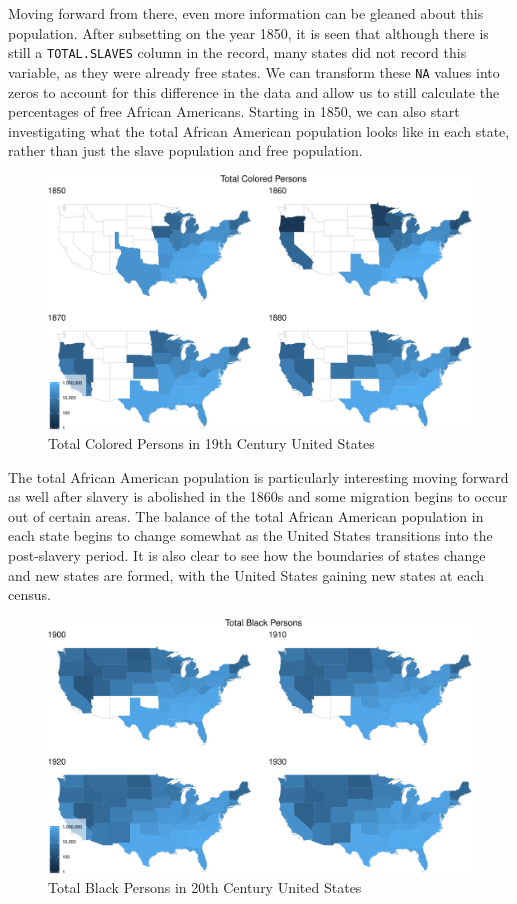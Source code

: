 \documentclass[11pt,]{article}
\begin{document}
Moving forward from there, even more information can be gleaned about
this population. After subsetting on the year 1850, it is seen that
although there is still a \texttt{TOTAL.SLAVES} column in the record,
many states did not record this variable, as they were already free
states. We can transform these \texttt{NA} values into zeros to account
for this difference in the data and allow us to still calculate the
percentages of free African Americans. Starting in 1850, we can also
start investigating what the total African American population looks
like in each state, rather than just the slave population and free
population.

\begin{figure}[htbp]
\centering
\includegraphics{writeup_files/figure-latex/unnamed-chunk-7-1.pdf}
\caption{Total Colored Persons in 19th Century United States}
\end{figure}

The total African American population is particularly interesting moving
forward as well after slavery is abolished in the 1860s and some
migration begins to occur out of certain areas. The balance of the total
African American population in each state begins to change somewhat as
the United States transitions into the post-slavery period. It is also
clear to see how the boundaries of states change and new states are
formed, with the United States gaining new states at each census.

\begin{figure}[htbp]
\centering
\includegraphics{writeup_files/figure-latex/unnamed-chunk-8-1.pdf}
\caption{Total Black Persons in 20th Century United States}
\end{figure}
\end{document}
